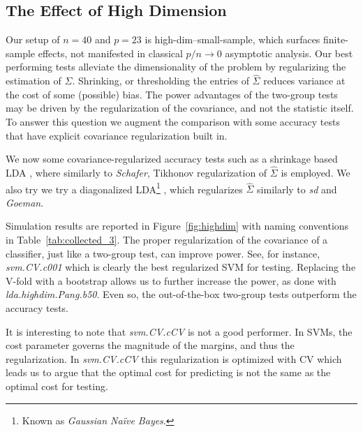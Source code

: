 \documentclass[journal]{IEEEtran}
\begin{document}
\subsection{The Effect of High Dimension}
\label{sec:highdim}

Our setup of $n=40$ and $p=23$ is high-dim--small-sample, which surfaces finite-sample effects, not manifested in classical $p/n \to 0$ asymptotic analysis.
Our best performing tests alleviate the dimensionality of the problem by regularizing the estimation of $\Sigma$. 
Shrinking, or thresholding the entries of $\hat{\Sigma}$ reduces variance at the cost of some (possible) bias. 
The power advantages of the two-group tests may be driven by the regularization of the covariance, and not the statistic itself.
To answer this question we augment the comparison with some accuracy tests that have explicit covariance regularization built in.

We now some covariance-regularized accuracy tests such as a shrinkage based LDA \cite{pang_shrinkage-based_2009,ramey_high-dimensional_2016}, where similarly to \emph{Schafer}, Tikhonov regularization of $\hat \Sigma$ is employed. 
We also try we try a diagonalized LDA\footnote{Known as \emph{Gaussian Na\"ive Bayes}.} \cite{dudoit_comparison_2002}, which regularizes $\hat{\Sigma}$ similarly to \emph{sd} and \emph{Goeman}.

Simulation results are reported in Figure~\ref{fig:highdim} with naming conventions in Table~\ref{tab:collected_3}.
The proper regularization of the covariance of a classifier, just like a two-group test, can improve power. 
See, for instance, \emph{svm.CV.c001} which is clearly the best regularized SVM for testing. 
Replacing the V-fold  with a bootstrap allows us to further increase the power, as done with \emph{lda.highdim.Pang.b50}.
Even so, the out-of-the-box two-group tests outperform the accuracy tests.

It is interesting to note that \emph{svm.CV.cCV} is not a good performer. 
In SVMs, the cost parameter governs the magnitude of the margins, and thus the regularization. 
In \emph{svm.CV.cCV} this regularization is optimized with CV which leads us to argue that the optimal cost for predicting is not the same as the optimal cost for testing.

\bigskip
\end{document}
